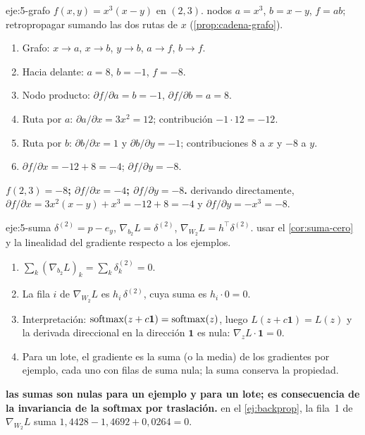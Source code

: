 \begin{solucion}{eje:5-grafo}
\datos $f(x,y)=x^{3}(x-y)$ en $(2,3)$.
\planteamiento nodos $a=x^{3}$, $b=x-y$, $f=ab$; retropropagar sumando las dos rutas de $x$ (\cref{prop:cadena-grafo}).
\pasos
\begin{enumerate}[label=\arabic*.]
  \item Grafo: $x\to a$, $x\to b$, $y\to b$, $a\to f$, $b\to f$.
  \item Hacia delante: $a=8$, $b=-1$, $f=-8$.
  \item Nodo producto: $\partial f/\partial a=b=-1$, $\partial f/\partial b=a=8$.
  \item Ruta por $a$: $\partial a/\partial x=3x^{2}=12$; contribución $-1\cdot 12=-12$.
  \item Ruta por $b$: $\partial b/\partial x=1$ y $\partial b/\partial y=-1$; contribuciones $8$ a $x$ y $-8$ a $y$.
  \item $\partial f/\partial x=-12+8=-4$; $\partial f/\partial y=-8$.
\end{enumerate}
\resultado \textbf{$f(2,3)=-8$; $\partial f/\partial x=-4$; $\partial f/\partial y=-8$.}
\comprobacion derivando directamente, $\partial f/\partial x=3x^{2}(x-y)+x^{3}=-12+8=-4$ y $\partial f/\partial y=-x^{3}=-8$.
\end{solucion}

\begin{solucion}{eje:5-suma}
\datos $\delta^{(2)}=p-e_y$, $\nabla_{\!b_2}L=\delta^{(2)}$, $\nabla_{\!W_2}L=h^{\top}\delta^{(2)}$.
\planteamiento usar el \cref{cor:suma-cero} y la linealidad del gradiente respecto a los ejemplos.
\pasos
\begin{enumerate}[label=\arabic*.]
  \item $\sum_k(\nabla_{\!b_2}L)_k=\sum_k\delta^{(2)}_k=0$.
  \item La fila $i$ de $\nabla_{\!W_2}L$ es $h_i\,\delta^{(2)}$, cuya suma es $h_i\cdot 0=0$.
  \item Interpretación: $\operatorname{softmax}(z+c\mathbf 1)=\operatorname{softmax}(z)$, luego $L(z+c\mathbf 1)=L(z)$ y la derivada direccional en la dirección $\mathbf 1$ es nula: $\nabla_{\!z}L\cdot\mathbf 1=0$.
  \item Para un lote, el gradiente es la suma (o la media) de los gradientes por ejemplo, cada uno con filas de suma nula; la suma conserva la propiedad.
\end{enumerate}
\resultado \textbf{las sumas son nulas para un ejemplo y para un lote; es consecuencia de la invariancia de la softmax por traslación.}
\comprobacion en el \cref{ej:backprop}, la fila~1 de $\nabla_{\!W_2}L$ suma $1{,}4428-1{,}4692+0{,}0264=0$.
\end{solucion}

